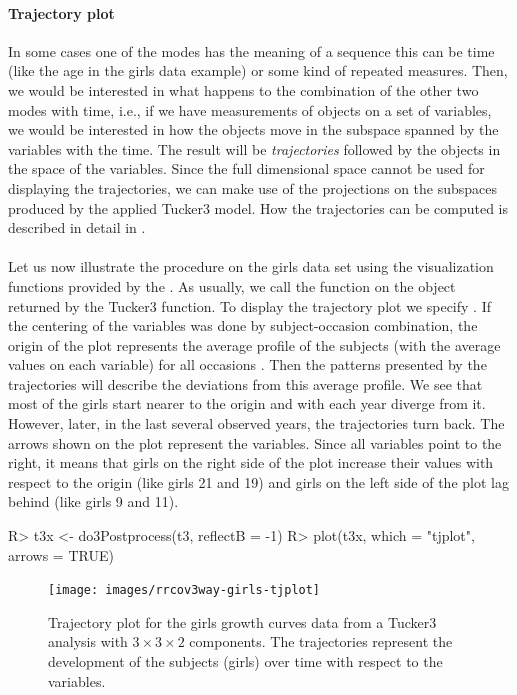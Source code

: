 \documentclass[article,shortnames, nojss]{jss}
\begin{document}
\paragraph{Trajectory plot} In some cases one of the modes has the meaning
of a sequence this can be time (like the age in the girls data example)
or some kind of repeated measures. Then, we would be interested in what happens
to the combination of the other two modes with time, i.e., if we have
measurements of objects on a set of variables, we would be interested in how
the objects move in the subspace spanned by the variables with the time.
The result will be \emph{trajectories} followed by the objects in the
space of the variables. Since the full dimensional space cannot be used for
displaying the trajectories, we can make use of the projections on the
subspaces produced by the applied Tucker3 model. How the trajectories
can be computed is described in detail in \cite{kiers2000some}.\\\\
Let us now illustrate the procedure on the girls data set using the
visualization functions provided by the . As usually,
we call the function  on the object returned by the
Tucker3 function. To display the trajectory plot we specify
. If the centering of the variables was done by
subject-occasion combination, the origin of the plot represents the
average profile of the subjects (with the average values on each
variable) for all occasions \citep[see][]{kroonenberg:2008}.
Then the patterns presented by the trajectories will describe
the deviations from this average profile. We see that most of the
girls start nearer to the origin and with each year diverge from it.
However, later, in the last several observed years, the trajectories turn
back. The arrows shown on the plot represent the variables. Since
all variables point to the right, it means that girls on the right side
of the plot increase their values with respect to the origin (like
girls 21 and 19) and girls on the left side of the plot lag behind
(like girls 9 and 11).
\begin{Schunk}
\begin{Sinput}
R> t3x <- do3Postprocess(t3, reflectB = -1)
R> plot(t3x, which = "tjplot", arrows = TRUE)
\end{Sinput}
\end{Schunk}
\begin{figure}[H]
\centering
\texttt{[image: images/rrcov3way-girls-tjplot]}
\caption{Trajectory plot for the girls growth curves data from a Tucker3
analysis with $3\times3\times2$ components. The trajectories represent
the development of the subjects (girls)
over time with respect to the variables.}
\label{fig-girls-tjplot}
\end{figure}
\end{document}
